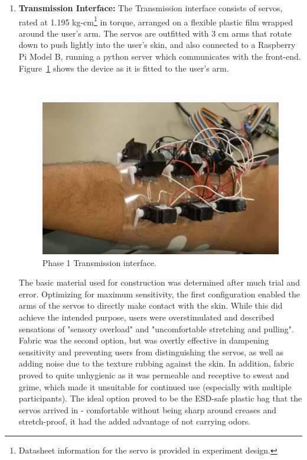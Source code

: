 \documentclass[
hidelinks,
12pt, %
oneside, %
english, %
doublespacing, %
headsepline, %
]{MastersDoctoralThesis} %
\begin{document}
\begin{enumerate}
\item \textbf{Transmission Interface:} The Transmission interface consists of servos, rated at 1.195 kg-cm\footnote{Datasheet information for the servo is provided in experiment design.} in torque, arranged on a flexible plastic film wrapped around the user's arm. The servos are outfitted with 3 cm arms that rotate down to push lightly into the user's skin, and also connected to a Raspberry Pi Model B, running a python server which communicates with the front-end. Figure~\ref{fig:device1} shows the device as it is fitted to the user's arm.

\,

\begin{figure}[ht]
\centering\includegraphics[width=0.7\linewidth]{images/v1device.png}
\caption[P1 Device]{Phase 1 Transmission interface.}
\decoRule
\label{fig:device1}
\end{figure}

The basic material used for construction was determined after much trial and error. Optimizing for maximum sensitivity, the first configuration enabled the arms of the servos to directly make contact with the skin. While this did achieve the intended purpose, users were overstimulated and described sensations of "sensory overload" and "uncomfortable stretching and pulling". Fabric was the second option, but was overtly effective in dampening sensitivity and preventing users from distinguishing the servos, as well as adding noise due to the texture rubbing against the skin. In addition, fabric proved to quite unhygienic as it was permeable and receptive to sweat and grime, which made it unsuitable for continued use (especially with multiple participants). The ideal option proved to be the ESD-safe plastic bag that the servos arrived in - comfortable without being sharp around creases and stretch-proof, it had the added advantage of not carrying odors.


\end{enumerate}
\end{document}
